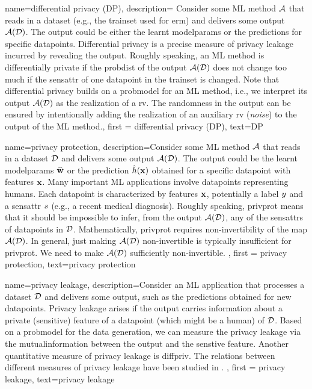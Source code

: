 {name=differential privacy (DP),
  description={
  	Consider some ML method $\mathcal{A}$ that reads in a \gls{dataset} (e.g., the \gls{trainset} 
  	used for \gls{erm}) and delivers some output $\mathcal{A}(\mathcal{D})$. The output 
  	could be either the learnt \gls{modelparams} or the \gls{prediction}s for specific \gls{datapoint}s. 
  	Differential privacy is a precise measure of privacy leakage incurred by revealing the 
  	output. Roughly speaking, an ML method is differentially private if the \gls{probdist} 
  	of the output $\mathcal{A}(\mathcal{D})$ does not change too much if the \gls{sensattr} 
  	of one \gls{datapoint} in the \gls{trainset} is changed. Note that differential privacy 
  	builds on a \gls{probmodel} for an ML method, i.e., we interpret its output $\mathcal{A}(\mathcal{D})$ 
  	as the \gls{realization} of a \gls{rv}. The randomness in the output can be ensured 
  	by intentionally adding the \gls{realization} of an auxiliary \gls{rv} (\emph{noise}) to 
  	the output of the ML method.}, 
	first = {differential privacy (DP)}, text={DP} 
}

{name=privacy protection,
     description={Consider some ML method $\mathcal{A}$ that reads 
	 in a \gls{dataset} $\mathcal{D}$ and delivers some output $\mathcal{A}(\mathcal{D})$. The output 
	 could be the learnt \gls{modelparams} $\widehat{{\bf w}}$ or the \gls{prediction} 
	 $\hat{h}({\bf x})$ obtained for a specific \gls{datapoint} with \gls{feature}s 
	 ${\bf x}$. Many important ML applications involve \gls{datapoint}s 
		representing humans. Each \gls{datapoint} is characterized by \gls{feature}s ${\bf x}$, 
		potentially a \gls{label} $y$ and a \gls{sensattr} $s$ (e.g., a recent medical diagnosis). 
		Roughly speaking, \gls{privprot} means that it should be impossible to infer, from the output $\mathcal{A}(\mathcal{D})$, 
		any of the \gls{sensattr}s of \gls{datapoint}s in $\mathcal{D}$. Mathematically, \gls{privprot} requires non-invertibility 
		of the map $\mathcal{A}(\mathcal{D})$. In general, just making $\mathcal{A}(\mathcal{D})$ non-invertible 
		is typically insufficient for \gls{privprot}. We need to make $\mathcal{A}(\mathcal{D})$ sufficiently non-invertible. 
	}, 
	first = {privacy protection}, text={privacy protection} 
}

{
	name=privacy leakage,
	description={Consider an ML application that processes a 
	\gls{dataset} $\mathcal{D}$ and delivers some output, such as the predictions 
	obtained for new \gls{datapoint}s. Privacy leakage arises 
	if the output carries information about a private (sensitive) \gls{feature} of 
	a \gls{datapoint} (which might be a human) of $\mathcal{D}$. Based on a \gls{probmodel} 
	for the data generation, we can measure the privacy leakage via the \gls{mutualinformation} 
	between the output and the senstive \gls{feature}. Another quantitative measure of privacy leakage 
	is \gls{diffpriv}. The relations between different measures of privacy leakage have been 
	studied in \cite{InfThDiffPriv}. 
	}, 
	first = {privacy leakage}, text={privacy leakage} 
}



